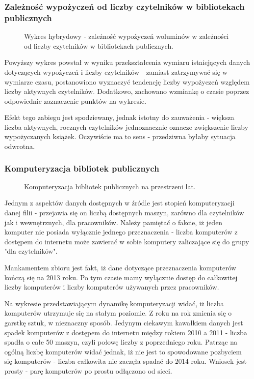 \documentclass[12pt]{article}
\begin{document}
\subsubsection{Zależność wypożyczeń od liczby czytelników w bibliotekach publicznych}
\begin{figure}[H]
    
    \caption{Wykres hybrydowy - zależność wypożyczeń woluminów w zależności od liczby czytelników w bibliotekach publicznych.}
\end{figure}

Powyższy wykres powstał w wyniku przekształcenia wymiaru istniejących danych dotyczących wypożyczeń i liczby czytelników - zamiast zatrzymywać się w wymiarze czasu, 
postanowiono wyznaczyć tendencję liczby wypożyczeń względem liczby aktywnych czytelników. Dodatkowo, zachowano wzmiankę o czasie poprzez odpowiednie zaznaczenie punktów 
na wykresie.

Efekt tego zabiegu jest spodziewany, jednak istotny do zauważenia - większa liczba aktywnych, rocznych czytelników jednoznacznie oznacze zwiększenie liczby wypożyczanych 
książek. Oczywiście ma to sens - przedziwna byłaby sytuacja odwrotna.

\subsubsection{Komputeryzacja bibliotek publicznych}
\begin{figure}[H]
    
    \caption{Komputeryzacja bibliotek publicznych na przestrzeni lat.}
\end{figure}
Jednym z aspektów danych dostępnych w źródle jest stopień komputeryzacji danej filii - przejawia się on liczbą dostępnych maszyn, zarówno dla czytelników jak i 
wewnętrznych, dla pracowników. Należy pamiętać o fakcie, iż jeden komputer nie posiada wyłącznie jednego przeznaczenia - liczba komputerów z dostępem do internetu może 
zawierać w sobie komputery zaliczające się do grupy "dla czytelników".

Mankamentem zbioru jest fakt, iż dane dotyczące przeznaczenia komputerów kończą się na 2013 roku. Po tym czasie mamy wyłącznie dostęp do całkowitej liczby komputerów i 
liczby komputerów używanych przez pracowników. 

Na wykresie przedstawiającym dynamikę komputeryzacji widać, iż liczba komputerów utrzymuje się na stałym poziomie. Z roku na rok zmienia się o garstkę sztuk, 
w nieznaczny sposób. 
Jedynym ciekawym kawałkiem danych jest spadek komputerów z dostępem do internetu między rokiem 2010 a 2011 - liczba spadła o całe 50 maszyn, czyli połowę liczby z 
poprzedniego roku. Patrząc na ogólną liczbę komputerów widać jednak, iż nie jest to spowodowane pozbyciem się komputerów - liczba całkowita nie zaczęła spadać do 2014 roku.
Wniosek jest prosty - parę komputerów po prostu odłączono od sieci.
\end{document}
